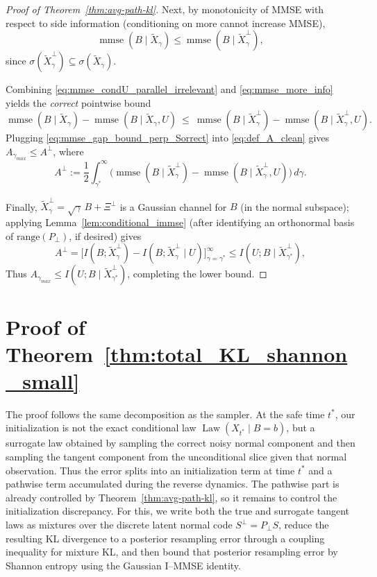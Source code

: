 \documentclass[twoside,11pt]{article}
\DeclareMathOperator{\mmse}{mmse}
\newcommand{\Law}{\operatorname{Law}}
\numberwithin{equation}{section}
\begin{document}
\begin{proof}[Proof of Theorem~\ref{thm:avg-path-kl}]
\smallskip
Next, by monotonicity of MMSE with respect to side information (conditioning on more cannot increase MMSE),
\begin{equation}\label{eq:mmse_more_info}
\mmse(B\mid \tilde X_\gamma)\le \mmse(B\mid \tilde X_\gamma^\perp),
\end{equation}
since $\sigma(\tilde X_\gamma^\perp)\subseteq \sigma(\tilde X_\gamma)$.

Combining \eqref{eq:mmse_condU_parallel_irrelevant} and \eqref{eq:mmse_more_info} yields the \emph{correct} pointwise bound
\begin{equation}\label{eq:mmse_gap_bound_perp_Sorrect}
\mmse(B\mid \tilde X_\gamma)-\mmse(B\mid \tilde X_\gamma,U)
\ \le\
\mmse(B\mid \tilde X_\gamma^\perp)-\mmse(B\mid \tilde X_\gamma^\perp,U).
\end{equation}
Plugging \eqref{eq:mmse_gap_bound_perp_Sorrect} into \eqref{eq:def_A_clean} gives $A_{\gamma_{max}}\le A^\perp$, where
\[
A^\perp:=\frac12\int_{\gamma^*}^{\infty}
\Big(\mmse(B\mid \tilde X_\gamma^\perp)-\mmse(B\mid \tilde X_\gamma^\perp,U)\Big)\,d\gamma.
\]

Finally, $\tilde X_\gamma^\perp=\sqrt{\gamma}\,B+\Xi^\perp$ is a Gaussian channel for $B$ (in the normal subspace);
applying Lemma~\ref{lem:conditional_immse} (after identifying an orthonormal basis of $\mathrm{range}(P_\perp)$, if desired)
gives
\[
A^\perp=\Big[I(B;\tilde X_\gamma^\perp)-I(B;\tilde X_\gamma^\perp\mid U)\Big]_{\gamma=\gamma^*}^{\infty}
\leq I(U;B\mid \tilde X_{\gamma^*}^\perp),
\]
Thus $A_{\gamma_{max}}\le I(U;B\mid \tilde X_{\gamma^*}^\perp)$, completing the lower bound.

\end{proof}


\section{Proof of Theorem~\ref{thm:total_KL_shannon_small}}

\noindent
The proof follows the same decomposition as the sampler. At the safe time \(t^*\), our
initialization is not the exact conditional law \(\Law(X_{t^*}\mid B=b)\), but a surrogate
law obtained by sampling the correct noisy normal component and then sampling the tangent
component from the unconditional slice given that normal observation. Thus the error splits
into an initialization term at time \(t^*\) and a pathwise term accumulated during the
reverse dynamics. The pathwise part is already controlled by
Theorem~\ref{thm:avg-path-kl}, so it remains to control the initialization discrepancy.
For this, we write both the true and surrogate tangent laws as mixtures over the discrete
latent normal code \(S^\perp=P_\perp S\), reduce the resulting KL divergence to a posterior
resampling error through a coupling inequality for mixture KL, and then bound that posterior
resampling error by Shannon entropy using the Gaussian I--MMSE identity.
\end{document}
